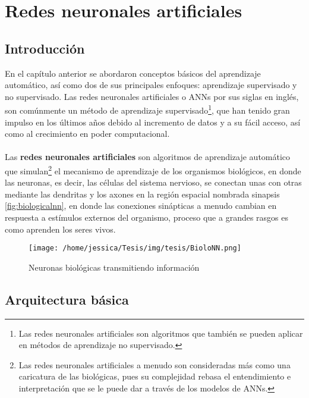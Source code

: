 \chapter{Redes neuronales artificiales}\label{ch:NNBasics}
\section{Introducción}

En el capítulo anterior se abordaron conceptos básicos del aprendizaje automático, así como dos de sus principales enfoques: aprendizaje supervisado y no supervisado. Las redes neuronales artificiales o \acs{ANN}s por sus siglas en inglés, son comúnmente un método de aprendizaje supervisado\footnote{Las redes neuronales artificiales son algoritmos que también se pueden aplicar en métodos de aprendizaje no supervisado.}, que han tenido gran impulso en los últimos años debido al incremento de datos y a su fácil acceso, así como al crecimiento en poder computacional.
\\
\\
Las \textbf{redes neuronales artificiales}  son algoritmos de aprendizaje automático que simulan\footnote{Las redes neuronales artificiales a menudo son consideradas más como una caricatura de las biológicas, pues su complejidad rebasa el entendimiento e interpretación que se le puede dar a través de los modelos de \acs{ANN}s.} el mecanismo de aprendizaje de los organismos biológicos, en donde las neuronas, es decir, las células del sistema nervioso, se conectan unas con otras mediante las dendritas y los axones en la región espacial nombrada sinapsis \autoref{fig:biologicalnn}, en donde las conexiones sinápticas a menudo cambian en respuesta a estímulos externos del organismo, proceso que a grandes rasgos es como aprenden los seres vivos. \cite{Nielsen:2018}

\begin{figure}[hb]
  \centering
  \texttt{[image: /home/jessica/Tesis/img/tesis/BioloNN.png]}
  \caption{Neuronas biológicas transmitiendo información \cite{Gardell:2010}}
  \label{fig:biologicalnn}
\end{figure}


\section{Arquitectura básica}

